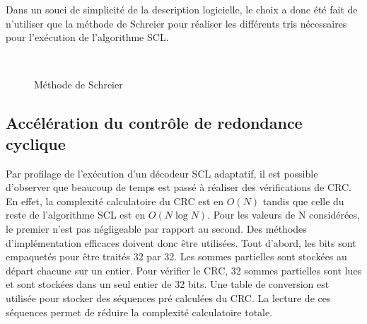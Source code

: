 Dans un souci de simplicité de la description logicielle, le choix a donc été fait de n'utiliser que la méthode de Schreier pour réaliser les différents tris nécessaires pour l'exécution de l'algorithme SCL.

\begin{figure}
\centering
{}
\\
\caption{Méthode de Schreier}
\label{fig:schreier_sort}
\end{figure}

\subsection{Accélération du contrôle de redondance cyclique}
Par profilage de l'exécution d'un décodeur SCL adaptatif, il est possible d'observer que beaucoup de temps est passé à réaliser des vérifications de CRC. En effet, la complexité calculatoire du CRC est en $O(N)$ tandis que celle du reste de l'algorithme SCL est en $O(N\log N)$. Pour les valeurs de N considérées, le premier n'est pas négligeable par rapport au second. Des méthodes d'implémentation efficaces doivent donc être utilisées. Tout d'abord, les bits sont empaquetés pour être traités 32 par 32. Les sommes partielles sont stockées au départ chacune sur un entier. Pour vérifier le CRC, 32 sommes partielles sont lues et sont stockées dans un seul entier de 32 bits. Une table de conversion est utilisée pour stocker des séquences pré calculées du CRC. La lecture de ces séquences permet de réduire la complexité calculatoire totale.

